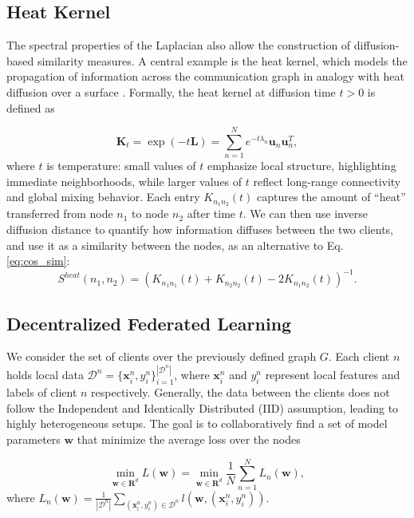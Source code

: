 \documentclass[journal]{IEEEtran}
\begin{document}
\subsection{Heat Kernel}
The spectral properties of the Laplacian also allow the construction of diffusion-based similarity measures. A central example is the heat kernel, which models the propagation of information across the communication graph in analogy with heat diffusion over a surface \cite{heat_kern}. Formally, the heat kernel at diffusion time $t > 0$ is defined as

\begin{equation} \label{eq:dif_ker}
    \mathbf{K}_t = \exp(-t\mathbf{L}) = \sum_{n=1}^N e^{-t\lambda_n}\mathbf{u}_n \mathbf{u}_n^T, 
\end{equation}
where $t$ is temperature: small values of $t$ emphasize local structure, highlighting immediate neighborhoods, while larger values of $t$ reflect long-range connectivity and global mixing behavior. Each entry $K_{n_1 n_2}(t)$ captures the amount of “heat” transferred from node $n_1$ to node $n_2$ after time $t$. We can then use inverse diffusion distance \cite{heat_kern} to quantify how information diffuses between the two clients, and use it as a similarity between the nodes, as an alternative to Eq. \ref{eq:cos_sim}:
\begin{equation}\label{eq:diff_dist}
    S^{heat}(n_1, n_2) =  (K_{n_1 n_1}(t) + K_{n_2 n_2}(t) - 2K_{n_1 n_2}(t))^{-1}.
\end{equation}


\subsection{Decentralized Federated Learning}

We consider the set of clients over the previously defined graph $G$. Each client $n$ holds local data $\mathcal{D}^n=\{\mathbf{x}^n_i, y^n_i\}_{i=1}^{|\mathcal{D}^n|}$, where $\mathbf{x}^n_i$ and $y^n_i$ represent local features and labels of client $n$ respectively. Generally, the data between the clients does not follow the Independent and Identically Distributed (IID) assumption, leading to highly heterogeneous setups. The goal is to collaboratively find a set of model parameters $\boldsymbol{w}$ that minimize the average loss over the nodes

\begin{equation} \label{eq:optim}
    \min_{\boldsymbol{w} \in \mathbf{R}^d} L(\boldsymbol{w})=\min_{\boldsymbol{w} \in \mathbf{R}^d} \frac{1}{N}\sum_{n=1}^{N}L_n(\boldsymbol{w}),
\end{equation}
where  $L_n(\boldsymbol{w})=\frac{1}{|\mathcal{D}^n|}\sum_{(\mathbf{x}^n_i, y^n_i) \in \mathcal{D}^n}l(\boldsymbol{w}, (\mathbf{x}^n_i, y^n_i))$. 
\end{document}
